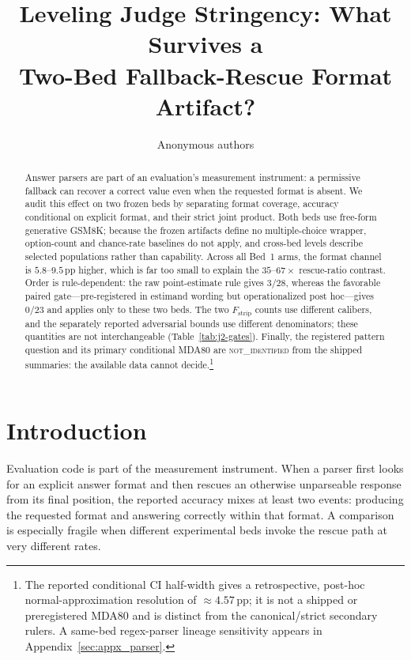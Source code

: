 \documentclass{article}
\title{Leveling Judge Stringency: What Survives a\\
Two-Bed Fallback-Rescue Format Artifact?}
\author{Anonymous authors}
\newcommand{\pp}{\,\mathrm{pp}}
\begin{document}
\raggedbottom
\maketitle

\begin{abstract}
Answer parsers are part of an evaluation's measurement instrument: a permissive
fallback can recover a correct value even when the requested format is absent.
We audit this effect on two frozen beds by separating format coverage, accuracy
conditional on explicit format, and their strict joint product.  Both beds use
free-form generative GSM8K; because the frozen artifacts define no
multiple-choice wrapper, option-count and chance-rate baselines do not apply,
and cross-bed levels describe selected populations rather than capability.
Across all Bed~1 arms, the format channel is $5.8$--$9.5\pp$ higher, which is
far too small to explain the $35$--$67\times$ rescue-ratio contrast.  Order is
rule-dependent: the raw point-estimate rule gives $3/28$, whereas the favorable
paired gate---pre-registered in estimand wording but operationalized post
hoc---gives $0/23$ and applies only to these two beds.  The two
$F_{\mathrm{strip}}$ counts use different calibers, and the separately reported
adversarial bounds use different denominators; these quantities are not
interchangeable (Table~\ref{tab:j2-gates}).  Finally, the registered pattern
question and its primary conditional MDA80 are \textsc{not\_identified} from
the shipped summaries: the available data cannot decide.\footnote{The reported
conditional CI half-width gives a retrospective, post-hoc normal-approximation
resolution of $\approx4.57\pp$; it is not a shipped or preregistered MDA80 and
is distinct from the canonical/strict secondary rulers.  A same-bed
regex-parser lineage sensitivity appears in Appendix~\ref{sec:appx_parser}.}
\end{abstract}

\section{Introduction}
\label{sec:intro}

Evaluation code is part of the measurement instrument.  When a parser first
looks for an explicit answer format and then rescues an otherwise unparseable
response from its final position, the reported accuracy mixes at least two
events: producing the requested format and answering correctly within that
format.  A comparison is especially fragile when different experimental beds
invoke the rescue path at very different rates.
\end{document}
